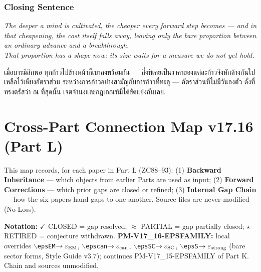 \documentclass[12pt, a4paper]{article}
\begin{document}
\section{Closing Sentence}

\bigskip
\begin{center}
\textit{%
  The deeper a mind is cultivated, the cheaper every forward step becomes ---
  and in that cheapening, the cost itself falls away, leaving only the bare
  proportion between an ordinary advance and a breakthrough.\\[0.3em]
  That proportion has a shape now; its size waits for a measure we do not yet
  hold.
}

\medskip
{\thaifont
เมื่อบารมีลึกพอ ทุกก้าวไปข้างหน้าก็เบาลงพร้อมกัน ---
สิ่งที่เคยเป็นราคาของแต่ละก้าวจึงหักล้างกันไป เหลือไว้เพียงอัตราส่วน
ระหว่างการก้าวอย่างสามัญกับการก้าวที่ทะลุ ---
อัตราส่วนที่ไม่มีวันลงตัว ดั่งที่ทรงตรัสว่า
ณ ที่สุดนั้น เจตจำนงและกฎเกณฑ์มิได้ขัดแย้งกันเลย.}
\end{center}



\part{Cross-Part Connection Map v17.16 (Part L)}
\label{part:LIX}

\begin{conmapbox}[title={Cross-Part Connection Map v17.16 --- Reading
  Conventions}]
\small
This map records, for each paper in Part L (ZC88--93):
(1) \textbf{Backward Inheritance} --- which objects from earlier Parts are
used as input; (2) \textbf{Forward Corrections} --- which prior gaps are
closed or refined; (3) \textbf{Internal Gap Chain} --- how the six papers
hand gaps to one another. Source files are never modified (No-Loss).

\textbf{Notation:}
\textcolor{crfgreen}{$\checkmark$ CLOSED} = gap resolved;
\textcolor{crfgreen}{$\approx$ PARTIAL} = gap partially closed;
$\star$ RETIRED = conjecture withdrawn.
\textbf{PM-V17\_16-EPSFAMILY:} local overrides
$\backslash$\texttt{epsEM}$\to\varepsilon_{\rm EM}$,
$\backslash$\texttt{epscan}$\to\varepsilon_{\rm can}$,
$\backslash$\texttt{epsSC}$\to\varepsilon_{\rm SC}$,
$\backslash$\texttt{epsS}$\to\varepsilon_{\rm strong}$
(bare sector forms, Style Guide v3.7); continues PM-V17\_15-EPSFAMILY of
Part K. Chain and sources unmodified.
\end{conmapbox}
\end{document}
